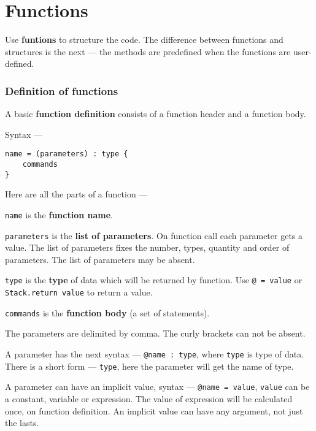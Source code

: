 \section{Functions}

Use {\bf funtions} to structure the code. The difference between functions and structures is the next — the methods are predefined when the functions are user-defined.

\subsubsection{Definition of functions}

A basic {\bf function definition} consists of a function header and a function body.

Syntax —
\begin{verbatim}
name = (parameters) : type {
	commands
}
\end{verbatim}

Here are all the parts of a function —
\begin{icItems}
\item
	\texttt{name} is the {\bf function name}.
\item
	\texttt{parameters} is the {\bf list of parameters}. On function call each parameter gets a value. The list of parameters fixes the number, types, quantity and order of parameters. The list of parameters may be absent.
\item
	\texttt{type} is the {\bf type} of data which will be returned by function. Use \texttt{@ = value} or \texttt{Stack.return value} to return a value.
\item
	\texttt{commands} is the {\bf function body} (a set of statements).
\end{icItems}

The parameters are delimited by comma. The curly brackets can not be absent.

A parameter has the next syntax — \texttt{@name : type}, where \texttt{type} is type of data. There is a short form — \texttt{type}, here the parameter will get the name of type.

A parameter can have an implicit value, syntax — \texttt{@name = value}, \texttt{value} can be a constant, variable or expression. The value of expression will be calculated once, on function definition. An implicit value can have any argument, not just the lasts.

